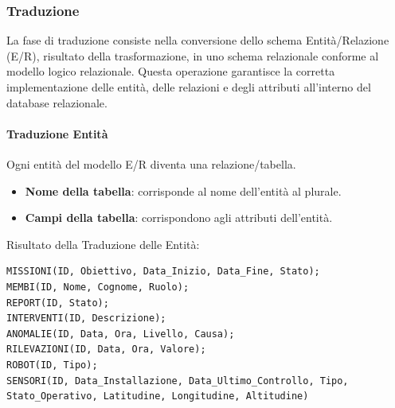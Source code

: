 \subsubsection{Traduzione}

La fase di traduzione consiste nella conversione dello schema Entità/Relazione (E/R), risultato della trasformazione, in uno schema relazionale conforme al modello logico relazionale. Questa operazione garantisce la corretta implementazione delle entità, delle relazioni e degli attributi all'interno del database relazionale.

\paragraph{Traduzione Entità}

Ogni entità del modello E/R diventa una relazione/tabella.
\begin{itemize}
    \item \textbf{Nome della tabella}: corrisponde al nome dell’entità al plurale.
    \item \textbf{Campi della tabella}: corrispondono agli attributi dell’entità.
\end{itemize}
\noindent
Risultato della Traduzione delle Entità:
\begin{lstlisting}
MISSIONI(ID, Obiettivo, Data_Inizio, Data_Fine, Stato);
MEMBI(ID, Nome, Cognome, Ruolo);
REPORT(ID, Stato);
INTERVENTI(ID, Descrizione);
ANOMALIE(ID, Data, Ora, Livello, Causa);
RILEVAZIONI(ID, Data, Ora, Valore);
ROBOT(ID, Tipo);
SENSORI(ID, Data_Installazione, Data_Ultimo_Controllo, Tipo, Stato_Operativo, Latitudine, Longitudine, Altitudine)
\end{lstlisting}

